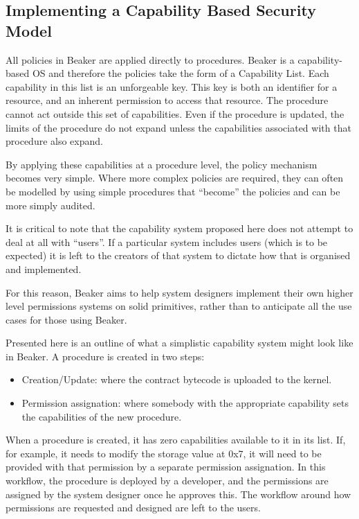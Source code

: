 \documentclass[english,a4paper]{article}
\begin{document}
\subsection{Implementing a Capability Based Security
Model}\label{implementing-a-capability-based-security-model}

All policies in Beaker are applied directly to procedures. Beaker is a
capability-based OS and therefore the policies take the form of a
Capability List. Each capability in this list is an unforgeable key.
This key is both an identifier for a resource, and an inherent
permission to access that resource. The procedure cannot act outside
this set of capabilities. Even if the procedure is updated, the limits
of the procedure do not expand unless the capabilities associated with
that procedure also expand.

By applying these capabilities at a procedure level, the policy
mechanism becomes very simple. Where more complex policies are required,
they can often be modelled by using simple procedures that ``become''
the policies and can be more simply audited.

It is critical to note that the capability system proposed here does not
attempt to deal at all with ``users''. If a particular system includes
users (which is to be expected) it is left to the creators of that
system to dictate how that is organised and implemented.

For this reason, Beaker aims to help system designers implement their
own higher level permissions systems on solid primitives, rather than to
anticipate all the use cases for those using Beaker.

Presented here is an outline of what a simplistic capability system
might look like in Beaker. A procedure is created in two steps:

\begin{itemize}
\item
  Creation/Update: where the contract bytecode is uploaded to the
  kernel.
\item
  Permission assignation: where somebody with the appropriate capability
  sets the capabilities of the new procedure.
\end{itemize}

When a procedure is created, it has zero capabilities available to it in
its list. If, for example, it needs to modify the storage value at 0x7,
it will need to be provided with that permission by a separate
permission assignation. In this workflow, the procedure is deployed by a
developer, and the permissions are assigned by the system designer once
he approves this. The workflow around how permissions are requested and
designed are left to the users.
\end{document}
